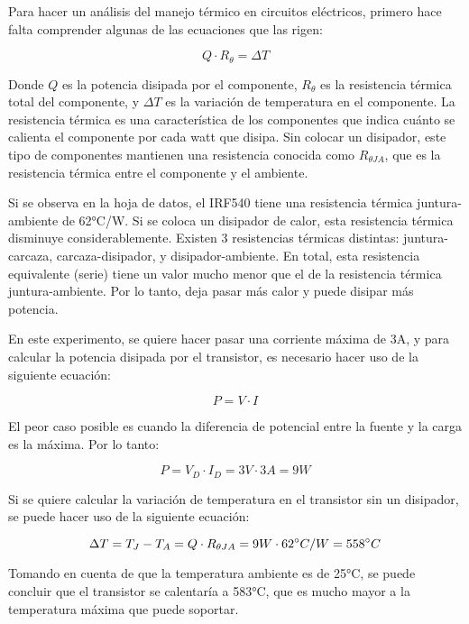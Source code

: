 \documentclass[12pt,oneside,a4paper]{article}
\begin{document}
Para hacer un análisis del manejo térmico en circuitos eléctricos, primero hace falta comprender algunas 
de las ecuaciones que las rigen:

\begin{equation}
    Q \cdot R_{\theta} = \Delta T
\end{equation}

Donde $Q$ es la potencia disipada por el componente, $R_{\theta}$ es la resistencia térmica total del componente,
y $\Delta T$ es la variación de temperatura en el componente. La resistencia térmica es una característica
de los componentes que indica cuánto se calienta el componente por cada watt que disipa. Sin colocar un 
disipador, este tipo de componentes mantienen una resistencia conocida como $R_{\theta JA}$, que es la
resistencia térmica entre el componente y el ambiente. 

Si se observa en la hoja de datos, el IRF540 tiene 
una resistencia térmica juntura-ambiente de 62°C/W. Si se coloca un disipador de calor, esta resistencia
térmica disminuye considerablemente. Existen 3 resistencias térmicas distintas: juntura-carcaza, 
carcaza-disipador, y disipador-ambiente. En total, esta resistencia equivalente (serie) tiene un valor 
mucho menor que el de la resistencia térmica juntura-ambiente. Por lo tanto, deja pasar más calor y 
puede disipar más potencia. 

En este experimento, se quiere hacer pasar una corriente máxima de 3A, y para calcular la potencia disipada 
por el transistor, es necesario hacer uso de la siguiente ecuación:

\begin{equation}
    P = V\cdot I
\end{equation}

El peor caso posible es cuando la diferencia de potencial entre la fuente y la carga es la máxima.
Por lo tanto:

\begin{equation}
    P = V_D \cdot I_D = 3V \cdot 3A = 9W
\end{equation}

Si se quiere calcular la variación de temperatura en el 
transistor sin un disipador, se puede hacer uso de la siguiente ecuación:

\begin{equation}
    \Delta T = T_J - T_A = Q \cdot R_{\theta JA} = 9W \cdot 62\degree C/W = 558 \degree C
\end{equation}

Tomando en cuenta de que la temperatura ambiente es de 25°C, se puede concluir que el transistor se 
calentaría a 583°C, que es mucho mayor a la temperatura máxima que puede soportar.
\end{document}
